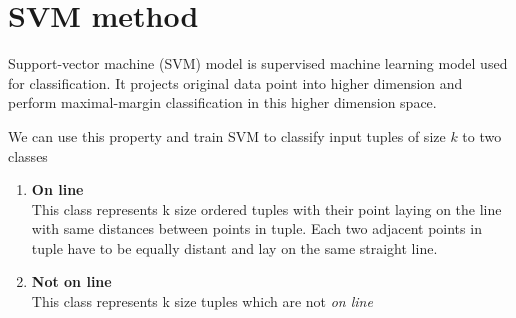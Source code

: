 \section{SVM method}

Support-vector machine (SVM) model is supervised machine learning model used for classification. It projects original data point into higher dimension and perform maximal-margin classification in this higher dimension space. 


We can use this property and train SVM to classify input tuples of size $k$ to two classes
\begin{enumerate}
    \item \textbf{On line}\\
    This class represents k size ordered tuples with their point laying on the line with same distances between points in tuple. Each two adjacent points in tuple have to be equally distant and  lay on the same straight line.
    
    \item \textbf{Not on line}\\
    This class represents k size tuples which are not \textit{on line}
\end{enumerate}

